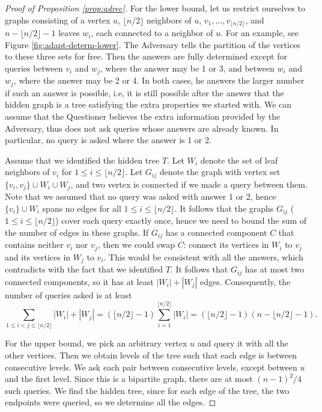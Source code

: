 \documentclass[12pt,a4paper]{amsart}
\theoremstyle{plain}
\theoremstyle{definition}
\begin{document}
\begin{proof}[Proof of Proposition \ref{prop:adrec}]
    For the lower bound, let us restrict ourselves to graphs consisting of a vertex $u$, $\lfloor n/2\rfloor$ neighbors of $u$, $v_1,\dots, v_{\lfloor n/2\rfloor}$, and $n-\lfloor n/2\rfloor-1$ leaves $w_i$, each connected to a neighbor of $u$. For an example, see Figure \ref{fig:adapt-determ-lower}. The Adversary tells the partition of the vertices to these three sets for free. Then the answers are fully determined except for queries between $v_i$ and $w_j$, where the answer may be 1 or 3, and between $w_i$ and $w_j$, where the answer may be 2 or 4. In both cases, he answers the larger number if such an answer is possible, i.e, it is still possible after the answer that the hidden graph is a tree satisfying the extra properties we started with. We can assume that the Questioner believes the extra information provided by the Adversary, thus does not ask queries whose answers are already known. In particular, no query is asked where the answer is 1 or 2.

    Assume that we identified the hidden tree $T$. Let $W_i$ denote the set of leaf neighbors of $v_i$ for $1 \leq i \leq \lfloor n/2\rfloor$. Let $G_{ij}$ denote the graph with vertex set $\{v_i,v_j\}\cup W_i\cup W_j$, and two vertex is connected if we made a query between them. Note that we assumed that no query was asked with answer 1 or 2, hence $\{v_i\}\cup W_i$ spans no edges for all $1 \leq i \leq \lfloor n/2\rfloor$. It follows that the graphs $G_{ij}$ ($1 \leq i \leq \lfloor n/2\rfloor$) cover each query exactly once, hence we need to bound the sum of the number of edges in these graphs. If $G_{ij}$ has a connected component $C$ that contains neither $v_i$ nor $v_j$, then we could swap $C$: connect its vertices in $W_i$ to $v_j$ and its vertices in $W_j$ to $v_i$. This would be consistent with all the answers, which contradicts with the fact that we identified $T$. It follows that $G_{ij}$ has at most two connected components, so it has at least $|W_i|+|W_j|$ edges. Consequently, the number of queries asked is at least
    \[ \sum_{1 \leq i<j \leq \lfloor n/2\rfloor} |W_i|+|W_j|=(\lfloor n/2\rfloor-1) \sum_{i=1}^{\lfloor n/2\rfloor} |W_i|= (\lfloor n/2\rfloor-1)(n-\lfloor n/2\rfloor-1).\]

 

 \smallskip

    For the upper bound, we pick an arbitrary vertex $u$ and query it with all the other vertices. Then we obtain levels of the tree such that each edge is between consecutive levels. We ask each pair between consecutive levels, except between $u$ and the first level. Since this is a bipartite graph, there are at most $(n-1)^2/4$ such queries. We find the hidden tree, since for each edge of the tree, the two endpoints were queried, so we determine all the edges.
\end{proof}
\end{document}
